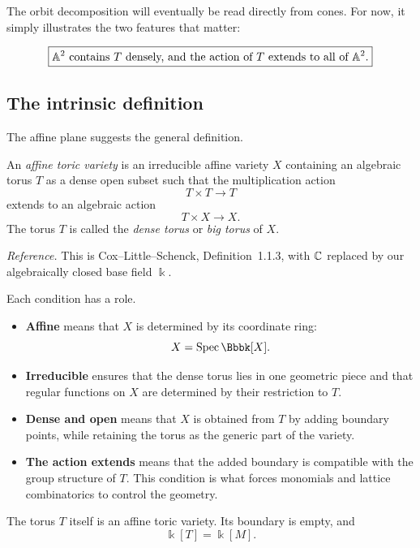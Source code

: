 The orbit decomposition will eventually be read directly from cones.
For now, it simply illustrates the two features that matter:

\[
\boxed{
\text{\(\mathbb{A}^2\) contains \(T\) densely, and the action of \(T\)
extends to all of \(\mathbb{A}^2\).}
}
\]

\subsection{The intrinsic definition}

The affine plane suggests the general definition.

\begin{definition}
\label{def:affine-toric-variety}
An \emph{affine toric variety} is an irreducible affine variety \(X\)
containing an algebraic torus \(T\) as a dense open subset such that
the multiplication action
\[
T\times T\longrightarrow T
\]
extends to an algebraic action
\[
T\times X\longrightarrow X.
\]
The torus \(T\) is called the \emph{dense torus} or \emph{big torus}
of \(X\).
\end{definition}

\noindent
\textit{Reference.}
This is Cox--Little--Schenck, Definition~1.1.3, with \(\mathbb{C}\) replaced
by our algebraically closed base field \(\Bbbk\).

Each condition has a role.

\begin{itemize}
\item \textbf{Affine} means that \(X\) is determined by its coordinate
ring:
\[
X=\Spec\Bbbk[X].
\]

\item \textbf{Irreducible} ensures that the dense torus lies in one
geometric piece and that regular functions on \(X\) are determined by
their restriction to \(T\).

\item \textbf{Dense and open} means that \(X\) is obtained from \(T\)
by adding boundary points, while retaining the torus as the generic
part of the variety.

\item \textbf{The action extends} means that the added boundary is
compatible with the group structure of \(T\). This condition is what
forces monomials and lattice combinatorics to control the geometry.
\end{itemize}

\begin{example}
The torus \(T\) itself is an affine toric variety. Its boundary is
empty, and
\[
\Bbbk[T]=\Bbbk[M].
\]
\end{example}


